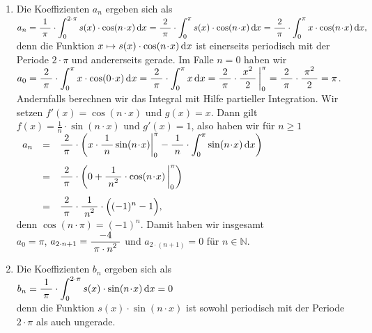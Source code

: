 \begin{enumerate}
\item Die Koeffizienten $a_n$ ergeben sich als 
      \\[0.3cm]
      \hspace*{0.5cm}
      $\displaystyle
        a_n  =  \displaystyle\frac{\;\displaystyle1\;}{\;\displaystyle\pi\;} \cdot\int_0^{2\cdot\pi} s(x) \cdot \cos(n\!\cdot\!x)\,\textrm{d} x 
             =  \displaystyle\frac{\;\displaystyle2\;}{\;\displaystyle\pi\;} \cdot\int_{0}^{\pi} s(x) \cdot \cos(n\!\cdot\!x)\,\textrm{d} x
             =  \displaystyle\frac{\;\displaystyle2\;}{\;\displaystyle\pi\;} \cdot\int_{0}^{\pi} x \cdot \cos(n\!\cdot\!x)\,\textrm{d} x, 
      $
      \\[0.3cm]
      denn die Funktion $x \mapsto s(x) \cdot \cos(n\!\cdot\!x)\,\textrm{d} x$ ist einerseits
      periodisch mit der Periode $2\cdot\pi$ und andererseits gerade.
      Im Falle $n=0$ haben wir 
      \\[0.1cm]
      \hspace*{1.3cm}
        $\displaystyle a_0 = \displaystyle\frac{\;\displaystyle2\;}{\;\displaystyle\pi\;} \cdot\int_{0}^{\pi} x \cdot \cos(0\!\cdot\!x)\,\textrm{d} x =
          \displaystyle\frac{\;\displaystyle2\;}{\;\displaystyle\pi\;} \cdot\int_{0}^{\pi} x \,\textrm{d} x = 
          \displaystyle\frac{\;\displaystyle2\;}{\;\displaystyle\pi\;} \cdot \displaystyle\frac{\;\displaystyle x^2\;}{\;\displaystyle2\;} \,\bigg|_0^\pi = \displaystyle\frac{\;\displaystyle2\;}{\;\displaystyle\pi\;} \cdot \displaystyle\frac{\;\displaystyle\pi^2\;}{\;\displaystyle2\;} =\pi$.
      \\[0.1cm]
      Andernfalls berechnen wir das Integral  mit Hilfe partieller Integration.  Wir setzen
      $f'(x) = \cos(n\!\cdot\!x)$ und $g(x) = x$.  Dann gilt
      $f(x) = \frac{1}{n}\cdot \sin(n\!\cdot\!x)$ und $g'(x) = 1$, also haben wir f\"ur 
      $n \geq 1$
      \\[0.3cm]
      \hspace*{1.3cm}
      $
      \begin{array}[t]{lcl}
         a_n &= &\displaystyle \displaystyle\frac{\;\displaystyle2\;}{\;\displaystyle\pi\;} \cdot\left( x \cdot \displaystyle\frac{\;\displaystyle1\;}{\;\displaystyle n\;}\sin(n\!\cdot\!x) \bigg|_0^{\pi} - 
               \displaystyle\frac{\;\displaystyle1\;}{\;\displaystyle n\;}\cdot \int_0^{\pi} \sin(n\!\cdot\!x)\,\textrm{d} x\right) \\[0.5cm]
             &= &\displaystyle \displaystyle\frac{\;\displaystyle2\;}{\;\displaystyle\pi\;} \cdot\left(0 + \displaystyle\frac{\;\displaystyle1\;}{\;\displaystyle n^2\;} \cdot \cos(n\!\cdot\!x)\, \bigg|_0^\pi\right) \\[0.5cm]
             &= &\displaystyle \displaystyle\frac{\;\displaystyle2\;}{\;\displaystyle\pi\;} \cdot\displaystyle\frac{\;\displaystyle1\;}{\;\displaystyle n^2\;}\cdot \Bigl( (-1)^n - 1 \Bigr), 
      \end{array}
      $
      \\[0.3cm]
      denn $\cos(n\cdot \pi) = (-1)^n$. Damit haben wir insgesamt
      \\[0.3cm]
      \hspace*{1.3cm}
      $a_0 = \pi$, \quad $a_{2\cdot n+1} = \displaystyle\frac{\;\displaystyle-4\;}{\;\displaystyle\pi\cdot n^2\;}$ \quad und \quad $a_{2\cdot(n+1)} = 0$ \quad f\"ur $n\in \mathbb{N}$.
\item Die Koeffizienten $b_n$ ergeben sich als
      \\[0.3cm]
      \hspace*{1.3cm}
      $b_n  = \displaystyle \displaystyle\frac{\;\displaystyle1\;}{\;\displaystyle\pi\;} \cdot\int_0^{2\cdot\pi} s(x) \cdot \sin(n\!\cdot\!x)\,\textrm{d} x = 0$
      \\[0.3cm]
      denn die Funktion $s(x) \cdot \sin(n\!\cdot\!x)$ ist sowohl periodisch mit der Periode $2\cdot\pi$ als auch ungerade.
\end{enumerate}
